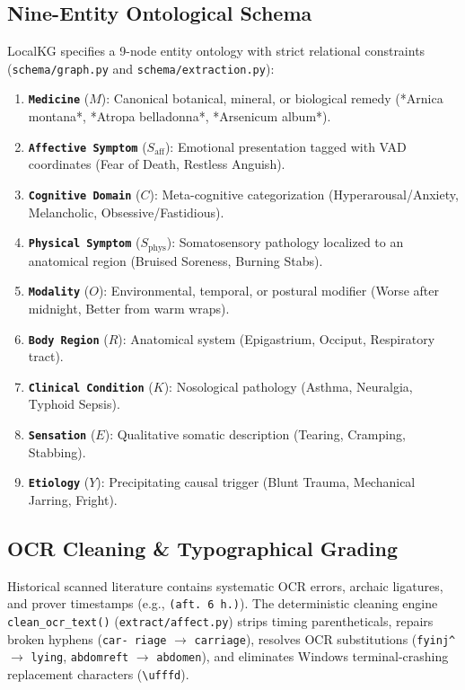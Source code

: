 \documentclass[10pt,twocolumn,letterpaper]{article}
\begin{document}
\subsection{Nine-Entity Ontological Schema}
LocalKG specifies a 9-node entity ontology with strict relational constraints (\texttt{schema/graph.py} and \texttt{schema/extraction.py}):
\begin{enumerate}[label=\arabic*.]
  \item \textbf{\texttt{Medicine}} ($M$): Canonical botanical, mineral, or biological remedy (*Arnica montana*, *Atropa belladonna*, *Arsenicum album*).
  \item \textbf{\texttt{Affective Symptom}} ($S_{\text{aff}}$): Emotional presentation tagged with VAD coordinates (Fear of Death, Restless Anguish).
  \item \textbf{\texttt{Cognitive Domain}} ($C$): Meta-cognitive categorization (Hyperarousal/Anxiety, Melancholic, Obsessive/Fastidious).
  \item \textbf{\texttt{Physical Symptom}} ($S_{\text{phys}}$): Somatosensory pathology localized to an anatomical region (Bruised Soreness, Burning Stabs).
  \item \textbf{\texttt{Modality}} ($O$): Environmental, temporal, or postural modifier (Worse after midnight, Better from warm wraps).
  \item \textbf{\texttt{Body Region}} ($R$): Anatomical system (Epigastrium, Occiput, Respiratory tract).
  \item \textbf{\texttt{Clinical Condition}} ($K$): Nosological pathology (Asthma, Neuralgia, Typhoid Sepsis).
  \item \textbf{\texttt{Sensation}} ($E$): Qualitative somatic description (Tearing, Cramping, Stabbing).
  \item \textbf{\texttt{Etiology}} ($Y$): Precipitating causal trigger (Blunt Trauma, Mechanical Jarring, Fright).
\end{enumerate}

\subsection{OCR Cleaning \& Typographical Grading}
Historical scanned literature contains systematic OCR errors, archaic ligatures, and prover timestamps (e.g., \texttt{(aft. 6 h.)}). The deterministic cleaning engine \texttt{clean\_ocr\_text()} (\texttt{extract/affect.py}) strips timing parentheticals, repairs broken hyphens (\texttt{car- riage} $\rightarrow$ \texttt{carriage}), resolves OCR substitutions (\texttt{fyinj\textasciicircum} $\rightarrow$ \texttt{lying}, \texttt{abdomreft} $\rightarrow$ \texttt{abdomen}), and eliminates Windows terminal-crashing replacement characters (\texttt{\textbackslash ufffd}).
\end{document}
